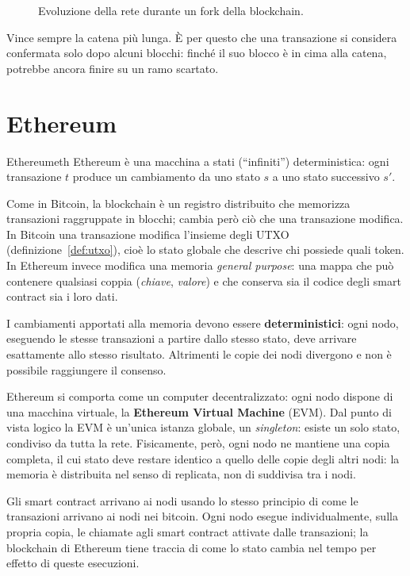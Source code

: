 \documentclass[a4paper, 11pt, oneside]{book}
\begin{document}
	\begin{figure}[H]
		\centering
		
		\caption{Evoluzione della rete durante un fork della blockchain.}
		\label{fig:fork}
	\end{figure}

	Vince sempre la catena più lunga.
    È per questo che una transazione si considera confermata solo dopo alcuni
	blocchi: finché il suo blocco è in cima alla catena, potrebbe ancora finire su un
	ramo scartato.

	\section{Ethereum}
	\begin{definizione}{Ethereum}{eth}
		Ethereum è una macchina a stati (``infiniti'') deterministica: ogni transazione
		$t$ produce un cambiamento da uno stato $s$ a uno stato successivo $s'$.
	\end{definizione}

	Come in Bitcoin, la blockchain è un registro distribuito che memorizza transazioni
	raggruppate in blocchi; cambia però ciò che una transazione modifica. In Bitcoin una
	transazione modifica l'insieme degli UTXO (definizione~\ref{def:utxo}), cioè lo
	stato globale che descrive chi possiede quali token. In Ethereum invece modifica una
	memoria \textit{general purpose}: una mappa che può contenere qualsiasi coppia
	(\textit{chiave}, \textit{valore}) e che conserva sia il codice degli smart contract
	sia i loro dati.

	\begin{attenzione}
		I cambiamenti apportati alla memoria devono essere \textbf{deterministici}: ogni
		nodo, eseguendo le stesse transazioni a partire dallo stesso stato, deve arrivare
		esattamente allo stesso risultato. Altrimenti le copie dei nodi divergono e non è
		possibile raggiungere il consenso.
	\end{attenzione}

	Ethereum si comporta come un computer decentralizzato: ogni nodo dispone di una
	macchina virtuale, la \textbf{Ethereum Virtual Machine} (EVM). Dal punto di vista
	logico la EVM è un'unica istanza globale, un \textit{singleton}: esiste un solo
	stato, condiviso da tutta la rete. Fisicamente, però, ogni nodo ne mantiene una copia
	completa, il cui stato deve restare identico a quello delle copie degli altri nodi:
	la memoria è distribuita nel senso di replicata, non di suddivisa tra i nodi.

    Gli smart contract arrivano ai nodi usando lo stesso principio di come le transazioni
    arrivano ai nodi nei bitcoin.
	Ogni nodo esegue individualmente, sulla propria copia, le chiamate agli smart
	contract attivate dalle transazioni; la blockchain di Ethereum tiene traccia di come
	lo stato cambia nel tempo per effetto di queste esecuzioni.
\end{document}
